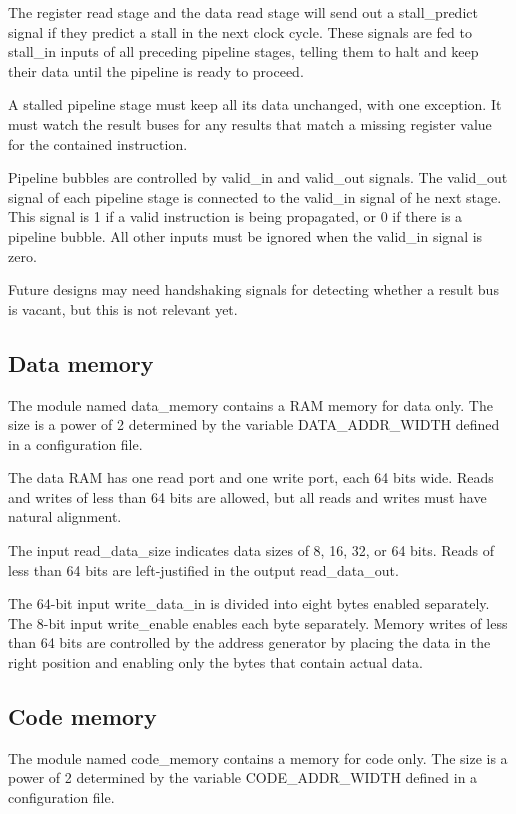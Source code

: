 \documentclass[11pt,a4paper,oneside,openright]{report}
\newcommand{\vv}{ \vspace{2mm} }   %
\begin{document}
The register read stage and the data read stage will send out a stall\_predict signal if they predict a stall in the next clock cycle. These signals are fed to stall\_in inputs of all preceding pipeline stages, telling them to halt and keep their data until the pipeline is ready to proceed.
\vv

A stalled pipeline stage must keep all its data unchanged, with one exception. It must watch the result buses for any results that match a missing register value for the contained instruction. 
\vv

Pipeline bubbles are controlled by valid\_in and valid\_out signals. The valid\_out signal of each pipeline stage is connected to the valid\_in signal of he next stage. This signal is 1 if a valid instruction is being propagated, or 0 if there is a pipeline bubble. All other inputs must be ignored when the valid\_in signal is zero.
\vv

Future designs may need handshaking signals for detecting whether a result bus is vacant, but this is not relevant yet.
\vv


\subsection{Data memory}
The module named data\_memory contains a RAM memory for data only. The size is a power of 2 determined by the variable DATA\_ADDR\_WIDTH defined in a configuration file.
\vv

The data RAM has one read port and one write port, each 64 bits wide. Reads and writes of less than 64 bits are allowed, but all reads and writes must have natural alignment.
\vv

The input read\_data\_size indicates data sizes of 8, 16, 32, or 64 bits. Reads of less than 64 bits are left-justified in the output read\_data\_out.
\vv

The 64-bit input write\_data\_in is divided into eight bytes enabled separately. The 8-bit input write\_enable enables each byte separately. Memory writes of less than 64 bits are controlled by the address generator by placing the data in the right position and enabling only the bytes that contain actual data.
\vv


\subsection{Code memory}
The module named code\_memory contains a memory for code only. The size is a power of 2 determined by the variable CODE\_ADDR\_WIDTH defined in a configuration file.
\vv
\end{document}
